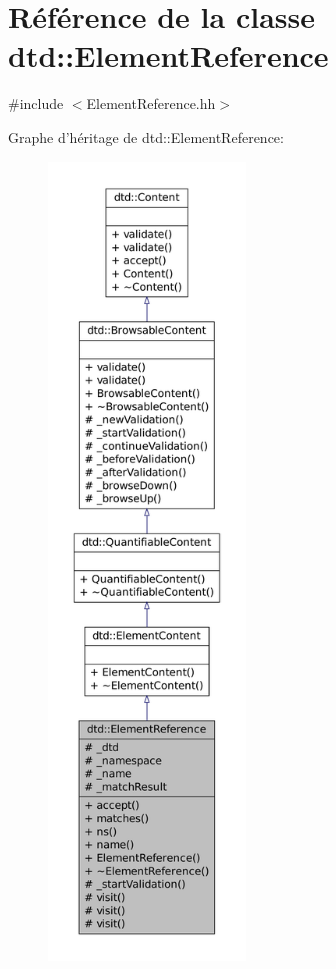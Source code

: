 \hypertarget{classdtd_1_1_element_reference}{
\section{Référence de la classe dtd::ElementReference}
\label{classdtd_1_1_element_reference}
}


{\ttfamily \#include $<$ElementReference.hh$>$}



Graphe d'héritage de dtd::ElementReference:\nopagebreak
\begin{figure}[H]
\begin{center}
\leavevmode
\includegraphics[height=600pt]{classdtd_1_1_element_reference__inherit__graph}
\end{center}
\end{figure}


